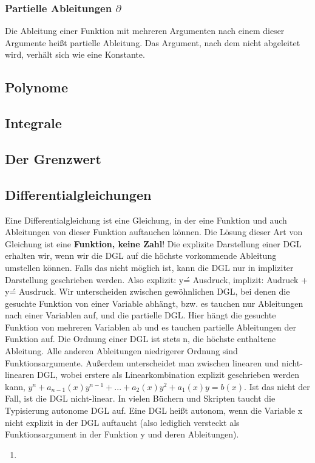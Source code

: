\documentclass[letterpaper, titlepage]{article}
\begin{document}
\subsubsection{Partielle Ableitungen $\partial$}\label{Partielle Ableitungen}
Die Ableitung einer Funktion mit mehreren Argumenten nach einem dieser Argumente heißt partielle Ableitung. Das Argument, nach dem nicht abgeleitet wird, verhält sich wie eine Konstante.\hfill\break
\\\setlength{\fboxrule}{1pt} %

\subsection{Polynome}\label{Polynome}

\subsection{Integrale}\label{Integrale}

\subsection{Der Grenzwert}\label{Der Grenzwert}

\subsection{Differentialgleichungen}\label{Differentialgleichung}
Eine Differentialgleichung ist eine Gleichung, in der eine Funktion und auch Ableitungen von dieser Funktion auftauchen können. Die Lösung dieser Art von Gleichung ist eine \textbf{Funktion, keine Zahl}! Die explizite Darstellung einer DGL erhalten wir, wenn wir die DGL auf die höchste vorkommende Ableitung umstellen können. Falls das nicht möglich ist, kann die DGL nur in impliziter Darstellung geschrieben werden. Also explizit: y\'= Ausdruck, implizit: Audruck + y\' = Ausdruck. Wir unterscheiden zwischen gewöhnlichen DGL, bei denen die gesuchte Funktion von einer Variable abhängt, bzw. es tauchen nur Ableitungen nach einer Variablen auf, und die partielle DGL. Hier hängt die gesuchte Funktion von mehreren Variablen ab und es tauchen partielle Ableitungen der Funktion auf. Die Ordnung einer DGL ist stets n, die höchste enthaltene Ableitung. Alle anderen Ableitungen niedrigerer Ordnung sind Funktionsargumente. Außerdem unterscheidet man zwischen linearen und nicht-linearen DGL, wobei erstere als Linearkombination explizit geschrieben werden kann, $y^n+a_{n-1}(x)y^{n-1}+...+a_2(x)y^2+a_1(x)y=b(x)$. Ist das nicht der Fall, ist die DGL nicht-linear. In vielen Büchern und Skripten taucht die Typisierung autonome DGL auf. Eine DGL heißt autonom, wenn die Variable x nicht explizit in der DGL auftaucht (also lediglich versteckt als Funktionsargument in der Funktion y und deren Ableitungen).
\begin{enumerate}
    \item 
\end{enumerate}
\end{document}

